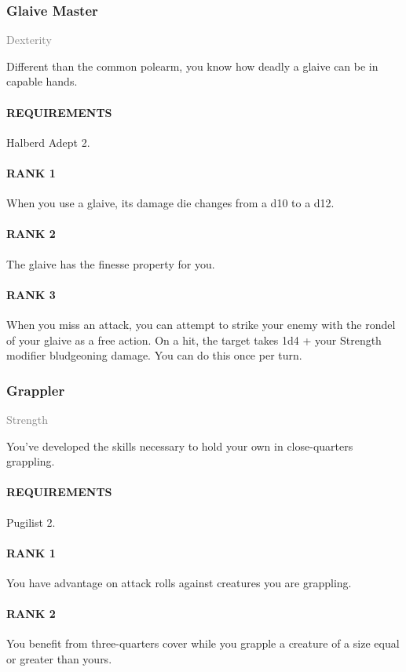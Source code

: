 \subsubsection{Glaive Master} \label{feat::glaivemaster}
\small{\textcolor{gray}{Dexterity}}

\normalsize
Different than the common polearm, you know how deadly a glaive can be in capable hands.
\paragraph{REQUIREMENTS} Halberd Adept 2.
\paragraph{RANK 1} When you use a glaive, its damage die changes from a d10 to a d12.
\paragraph{RANK 2} The glaive has the finesse property for you.
\paragraph{RANK 3} When you miss an attack, you can attempt to strike your enemy with the rondel of your glaive as a free action.
On a hit, the target takes 1d4 + your Strength modifier bludgeoning damage.
You can do this once per turn.

\subsubsection{Grappler} \label{feat::grappler}
\small{\textcolor{gray}{Strength}}

\normalsize
You've developed the skills necessary to hold your own in close-quarters grappling.
\paragraph{REQUIREMENTS} Pugilist 2.
\paragraph{RANK 1} You have advantage on attack rolls against creatures you are grappling.
\paragraph{RANK 2} You benefit from three-quarters cover while you grapple a creature of a size equal or greater than yours.
